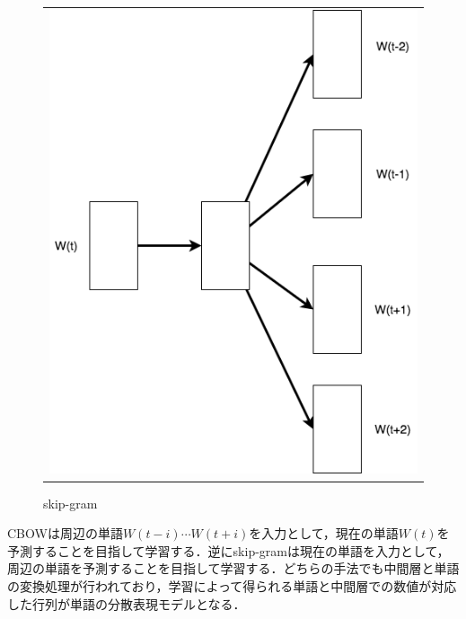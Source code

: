 \begin{figure}[htbp]
\begin{center}
\begin{tabular}{c}
\begin{minipage}{0.5\textwidth}
\begin{center}
  			\caption{CBOW}
 	 		\label{Fig:CBOW}
 		 	\vspace{-10pt}
 		\end{center}
		\end{minipage}
      		\begin{minipage}{0.5\textwidth}
       		 \begin{center}
 	 		\includegraphics[width=\hsize]{../images/2.Related_Work/skip-gram.png}
  			\caption{skip-gram}
 	 		\label{Fig:skip-gram}
 		 	\vspace{-10pt}
 		\end{center}
		\end{minipage}
	\end{tabular}
	 \end{center}
\end{figure}

CBOWは周辺の単語$W(t-i) \cdots  W(t+i)$を入力として，現在の単語$W(t)$を予測することを目指して学習する．逆にskip-gramは現在の単語を入力として，周辺の単語を予測することを目指して学習する．どちらの手法でも中間層と単語の変換処理が行われており，学習によって得られる単語と中間層での数値が対応した行列が単語の分散表現モデルとなる．


